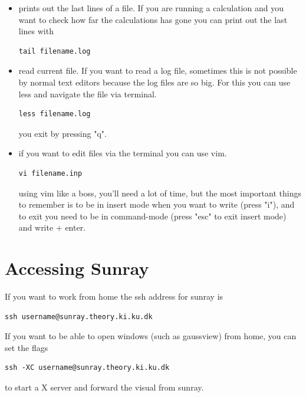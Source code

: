 \documentclass{article}
\begin{document}
\begin{itemize}
    \item {} prints out the last lines of a file. 
        If you are running a calculation and you want to check how far the calculations has gone you can print out the last lines with
\begin{lstlisting}
tail filename.log
\end{lstlisting}

    \item {} read current file. If you want to read a log file, sometimes this is not possible by normal text editors because the log files are so big. For this you can use less and navigate the file via terminal.
\begin{lstlisting}
less filename.log
\end{lstlisting}
    you exit by pressing "q".

    \item {} if you want to edit files via the terminal you can use vim. 
\begin{lstlisting}
vi filename.inp
\end{lstlisting}
using vim like a boss, you'll need a lot of time, but the most important things to remember is to be in insert mode when you want to write (press "i"), and to exit you need to be in command-mode (press "esc" to exit insert mode) and write  + enter.

\end{itemize}

\newpage
\section{Accessing Sunray}

If you want to work from home the ssh address for sunray is

\begin{lstlisting}
ssh username@sunray.theory.ki.ku.dk
\end{lstlisting}

If you want to be able to open windows (such as gaussview) from home, you can set the flags

\begin{lstlisting}
ssh -XC username@sunray.theory.ki.ku.dk
\end{lstlisting}

to start a X server and forward the visual from sunray.

\end{document}
